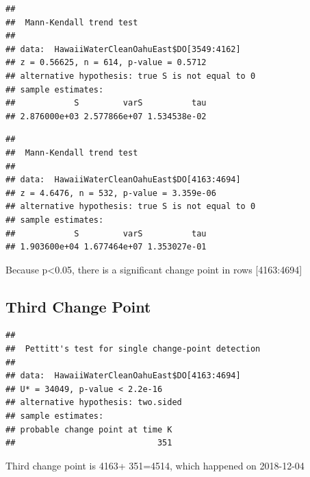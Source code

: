 \documentclass[12pt,]{article}
\newenvironment{Shaded}{\begin{snugshade}}{\end{snugshade}}
\newcommand{\KeywordTok}[1]{\textcolor[rgb]{0.13,0.29,0.53}{\textbf{#1}}}
\newcommand{\DecValTok}[1]{\textcolor[rgb]{0.00,0.00,0.81}{#1}}
\newcommand{\OperatorTok}[1]{\textcolor[rgb]{0.81,0.36,0.00}{\textbf{#1}}}
\newcommand{\NormalTok}[1]{#1}
\begin{document}
\begin{verbatim}
## 
##  Mann-Kendall trend test
## 
## data:  HawaiiWaterCleanOahuEast$DO[3549:4162]
## z = 0.56625, n = 614, p-value = 0.5712
## alternative hypothesis: true S is not equal to 0
## sample estimates:
##            S         varS          tau 
## 2.876000e+03 2.577866e+07 1.534538e-02
\end{verbatim}

\begin{Shaded}
\end{Shaded}

\begin{verbatim}
## 
##  Mann-Kendall trend test
## 
## data:  HawaiiWaterCleanOahuEast$DO[4163:4694]
## z = 4.6476, n = 532, p-value = 3.359e-06
## alternative hypothesis: true S is not equal to 0
## sample estimates:
##            S         varS          tau 
## 1.903600e+04 1.677464e+07 1.353027e-01
\end{verbatim}

Because p\textless{}0.05, there is a significant change point in rows
{[}4163:4694{]}

\subsection{Third Change Point}\label{third-change-point-2}

\begin{Shaded}
\end{Shaded}

\begin{verbatim}
## 
##  Pettitt's test for single change-point detection
## 
## data:  HawaiiWaterCleanOahuEast$DO[4163:4694]
## U* = 34049, p-value < 2.2e-16
## alternative hypothesis: two.sided
## sample estimates:
## probable change point at time K 
##                             351
\end{verbatim}

Third change point is 4163+ 351=4514, which happened on 2018-12-04
\end{document}
